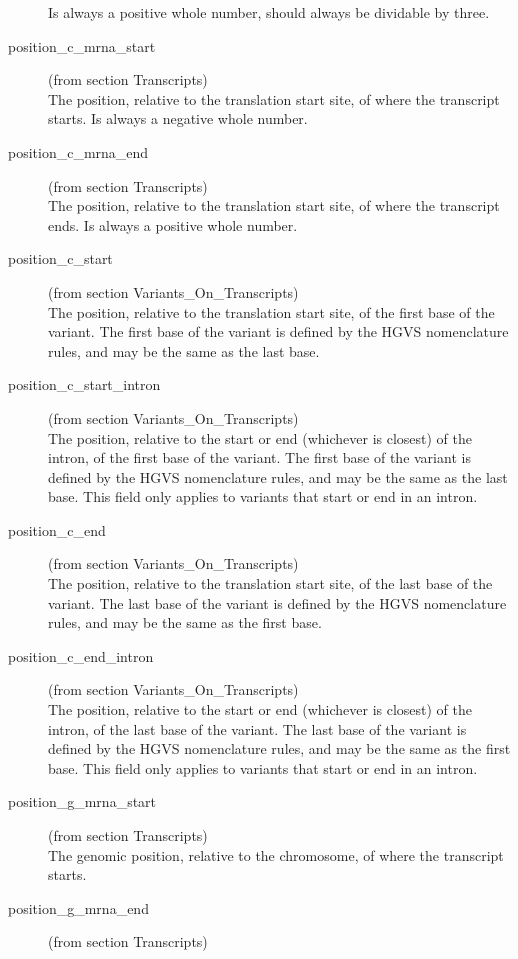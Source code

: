 \documentclass[a4paper,oneside,openany,12pt]{memoir}
\begin{document}
\begin{description}
  Is always a positive whole number, should always be dividable by three.
  \item[position\_c\_mrna\_start] (from section Transcripts)\hfill \\
  The position, relative to the translation start site, of where the transcript starts.
  Is always a negative whole number.
  \item[position\_c\_mrna\_end] (from section Transcripts)\hfill \\
  The position, relative to the translation start site, of where the transcript ends.
  Is always a positive whole number.
  \item[position\_c\_start] (from section Variants\_On\_Transcripts)\hfill \\
  The position, relative to the translation start site, of the first base of the variant.
  The first base of the variant is defined by the HGVS nomenclature rules, and may be the same as the last base.
  \item[position\_c\_start\_intron] (from section Variants\_On\_Transcripts)\hfill \\
  The position, relative to the start or end (whichever is closest) of the intron, of the first base of the variant.
  The first base of the variant is defined by the HGVS nomenclature rules, and may be the same as the last base.
  This field only applies to variants that start or end in an intron.
  \item[position\_c\_end] (from section Variants\_On\_Transcripts)\hfill \\
  The position, relative to the translation start site, of the last base of the variant.
  The last base of the variant is defined by the HGVS nomenclature rules, and may be the same as the first base.
  \item[position\_c\_end\_intron] (from section Variants\_On\_Transcripts)\hfill \\
  The position, relative to the start or end (whichever is closest) of the intron, of the last base of the variant.
  The last base of the variant is defined by the HGVS nomenclature rules, and may be the same as the first base.
  This field only applies to variants that start or end in an intron.
  \item[position\_g\_mrna\_start] (from section Transcripts)\hfill \\
  The genomic position, relative to the chromosome, of where the transcript starts.
  \item[position\_g\_mrna\_end] (from section Transcripts)\hfill \\

\end{description}
\end{document}
